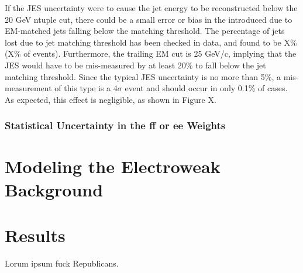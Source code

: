 \documentclass[dissertation.tex]{subfiles}
\begin{document}
If the JES uncertainty were to cause the jet energy to be reconstructed below the 20 GeV ntuple cut, there could be a small error or bias in the \MET introduced due to EM-matched jets falling below the matching threshold.  The percentage of jets lost due to jet \ET matching threshold has been checked in data, and found to be X\% (X\% of events).  Furthermore, the trailing EM \ET cut is 25 GeV/c, implying that the JES would have to be mis-measured by at least 20\% to fall below the jet matching threshold.  Since the typical JES uncertainty is no more than 5\%, a mis-measurement of this type is a 4$\sigma$ event and should occur in only 0.1\% of cases.  As expected, this effect is negligible, as shown in Figure X.


\subsubsection{Statistical Uncertainty in the ff or ee Weights}
\label{sec:Statistical Uncertainty in the ff or ee Weights}

\section{Modeling the Electroweak Background}
\section{Results}

Lorum ipsum fuck Republicans.
\end{document}
